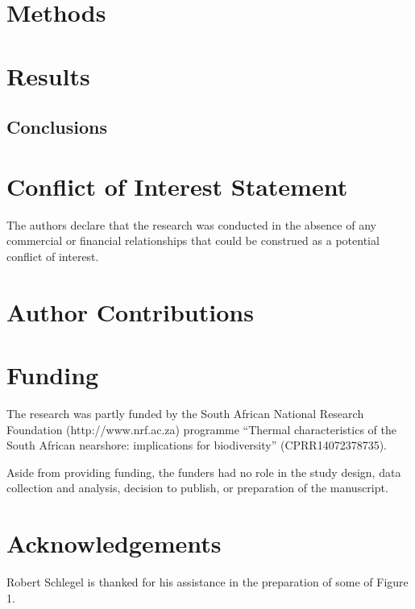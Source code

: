 \documentclass[utf8]{frontiersSCNS} %
\begin{document}
\section{Methods}

\section{Results}

\subsection{Conclusions}

\section*{Conflict of Interest Statement}
The authors declare that the research was conducted in the absence of any commercial or financial relationships that could be construed as a potential conflict of interest.

\section*{Author Contributions}

\section*{Funding}
The research was partly funded by the South African National Research Foundation (http://www.nrf.ac.za) programme ``Thermal characteristics of the
South African nearshore: implications for biodiversity'' (CPRR14072378735).

Aside from providing funding, the funders had no role in the study design, data collection and analysis, decision to publish, or preparation of the manuscript.

\section*{Acknowledgements}
Robert Schlegel is thanked for his assistance in the preparation of some of Figure 1.




\clearpage
\nolinenumbers
\end{document}
